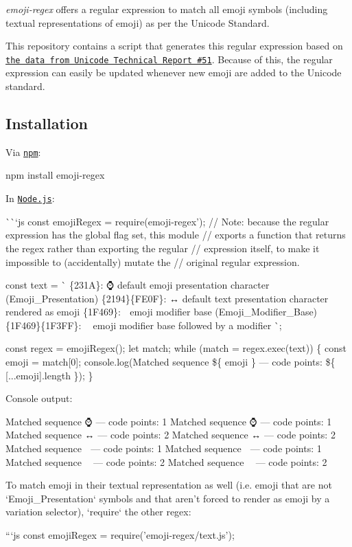 {\itshape emoji-\/regex} offers a regular expression to match all emoji symbols (including textual representations of emoji) as per the Unicode Standard.

This repository contains a script that generates this regular expression based on \href{https://github.com/mathiasbynens/unicode-tr51}{\tt the data from Unicode Technical Report \#51}. Because of this, the regular expression can easily be updated whenever new emoji are added to the Unicode standard.

\subsection*{Installation}

Via \href{https://www.npmjs.com/}{\tt npm}\+:


\begin{DoxyCode}
npm install emoji-regex
\end{DoxyCode}


In \href{https://nodejs.org/}{\tt Node.\+js}\+:

\`{}\`{}`js const emoji\+Regex = require(\textquotesingle{}emoji-\/regex'); // Note\+: because the regular expression has the global flag set, this module // exports a function that returns the regex rather than exporting the regular // expression itself, to make it impossible to (accidentally) mutate the // original regular expression.

const text = \`{} \{231A\}\+: ⌚ default emoji presentation character (Emoji\+\_\+\+Presentation) \{2194\}\{F\+E0F\}\+: ↔️ default text presentation character rendered as emoji \{1\+F469\}\+: 👩 emoji modifier base (Emoji\+\_\+\+Modifier\+\_\+\+Base) \{1\+F469\}\{1\+F3\+FF\}\+: 👩🏿 emoji modifier base followed by a modifier \`{};

const regex = emoji\+Regex(); let match; while (match = regex.\+exec(text)) \{ const emoji = match\mbox{[}0\mbox{]}; console.\+log({\ttfamily Matched sequence \$\{ emoji \} — code points\+: \$\{ \mbox{[}...emoji\mbox{]}.length \}}); \} 
\begin{DoxyCode}
Console output:
\end{DoxyCode}
 Matched sequence ⌚ — code points\+: 1 Matched sequence ⌚ — code points\+: 1 Matched sequence ↔️ — code points\+: 2 Matched sequence ↔️ — code points\+: 2 Matched sequence 👩 — code points\+: 1 Matched sequence 👩 — code points\+: 1 Matched sequence 👩🏿 — code points\+: 2 Matched sequence 👩🏿 — code points\+: 2 
\begin{DoxyCode}
To match emoji in their textual representation as well (i.e. emoji that are not `Emoji\_Presentation`
       symbols and that aren’t forced to render as emoji by a variation selector), `require` the other regex:

```js
const emojiRegex = require('emoji-regex/text.js');
\end{DoxyCode}


